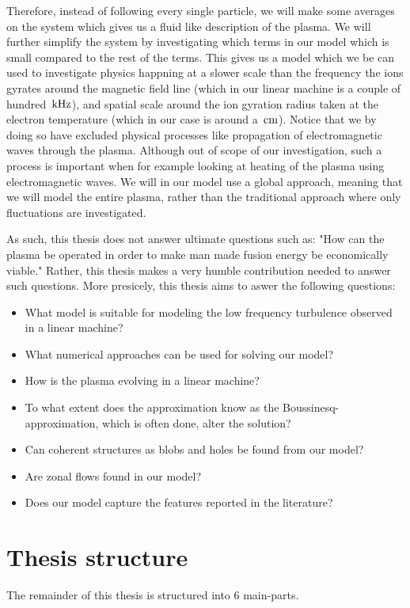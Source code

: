 Therefore, instead of following every single particle, we will make some averages on the system which gives us a fluid like description of the plasma.
We will further simplify the system by investigating which terms in our model which is small compared to the rest of the terms.
This gives us a model which we be can used to investigate physics happning at a slower scale than the frequency the ions gyrates around the magnetic field line (which in our linear machine is a couple of hundred $\, \text{kHz}$), and spatial scale around the ion gyration radius taken at the electron temperature (which in our case is around a $\, \text{cm}$).
Notice that we by doing so have excluded physical processes like propagation of electromagnetic waves through the plasma.
Although out of scope of our investigation, such a process is important when for example looking at heating of the plasma using electromagnetic waves.
We will in our model use a global approach, meaning that we will model the entire plasma, rather than the traditional approach where only fluctuations are investigated.

As such, this thesis does not answer ultimate questions such as:
"How can the plasma be operated in order to make man made fusion energy be economically viable."
Rather, this thesis makes a very humble contribution needed to answer such questions.
More presicely, this thesis aims to aswer the following questions:
%
\begin{itemize}[noitemsep]
    \item What model is suitable for modeling the low frequency turbulence observed in a linear machine?
    \item What numerical approaches can be used for solving our model?
    \item How is the plasma evolving in a linear machine?
    \item To what extent does the approximation know as the Boussinesq-approximation, which is often done, alter the solution?
    \item Can coherent structures as blobs and holes be found from our model?
    \item Are zonal flows found in our model?
    \item Does our model capture the features reported in the literature?
\end{itemize}



\section{Thesis structure}
%
The remainder of this thesis is structured into $6$ main-parts.

